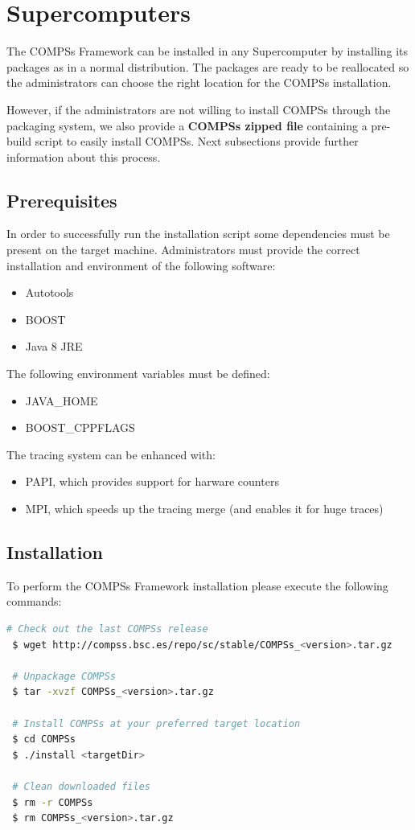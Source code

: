 \section{Supercomputers}
\label{sec:Supercomputers}

The COMPSs Framework can be installed in any Supercomputer by installing its packages as in a normal distribution. The packages are
ready to be reallocated so the administrators can choose the right location for the COMPSs installation. \newline

However, if the administrators are not willing to install COMPSs through the packaging system, we also provide a \textbf{COMPSs 
zipped file} containing a pre-build script to easily install COMPSs. Next subsections provide further information about this process.


\subsection{Prerequisites}
\label{subsec:supercomputers_prerequisites}
In order to successfully run the installation script some dependencies must be present on the target machine. Administrators must 
provide the correct installation and environment of the following software:
\begin{itemize}
 \item Autotools
 \item BOOST
 \item Java 8 JRE
\end{itemize}

The following environment variables must be defined:
\begin{itemize}
 \item JAVA\_HOME
 \item BOOST\_CPPFLAGS
\end{itemize}

The tracing system can be enhanced with:
\begin{itemize}
 \item PAPI, which provides support for harware counters
 \item MPI, which speeds up the tracing merge (and enables it for huge traces)
\end{itemize}


\subsection{Installation}
To perform the COMPSs Framework installation please execute the following commands:
\begin{lstlisting}[language=bash]
 # Check out the last COMPSs release
 $ wget http://compss.bsc.es/repo/sc/stable/COMPSs_<version>.tar.gz

 # Unpackage COMPSs
 $ tar -xvzf COMPSs_<version>.tar.gz
 
 # Install COMPSs at your preferred target location
 $ cd COMPSs
 $ ./install <targetDir>
 
 # Clean downloaded files
 $ rm -r COMPSs
 $ rm COMPSs_<version>.tar.gz
\end{lstlisting}

